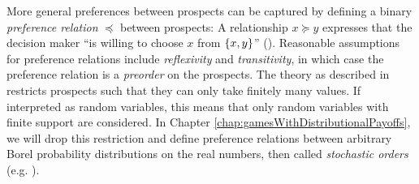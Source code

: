 \documentclass[a4paper,DIV=11]{scrreprt}
\theoremstyle{definition}
\begin{document}
    More general preferences between prospects can be captured by defining a binary \emph{preference relation} $\preccurlyeq$ between prospects:
    A relationship $x \succcurlyeq y$ expresses that the decision maker “is willing to choose $x$ from $\{x, y\}$” (\cite[p. 14]{bib:wakkerProspectTheory}).
    Reasonable assumptions for preference relations include \emph{reflexivity} and \emph{transitivity}, in which case the preference relation is a \emph{preorder} on the prospects.
    The theory as described in \cite{bib:wakkerProspectTheory} restricts prospects such that they can only take finitely many values. If interpreted as random variables, this means that only random variables with finite support are considered. In Chapter \ref{chap:gamesWithDistributionalPayoffs}, we will drop this restriction and define preference relations between arbitrary Borel probability distributions on the real numbers, then called \emph{stochastic orders} (e.g. \cite{bib:shakedStochasticOrders}).
    
\end{document}
